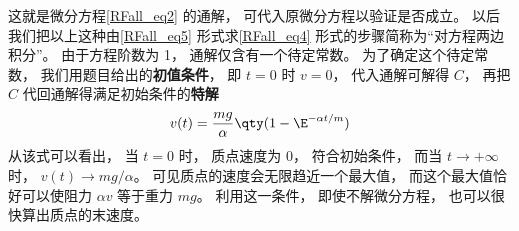 这就是微分方程\autoref{RFall_eq2} 的通解， 可代入原微分方程以验证是否成立。 以后我们把以上这种由\autoref{RFall_eq5} 形式求\autoref{RFall_eq4} 形式的步骤简称为“对方程两边积分”。 由于方程阶数为 1， 通解仅含有一个待定常数。 为了确定这个待定常数， 我们用题目给出的\textbf{初值条件}， 即 $t = 0$ 时 $v = 0$， 代入通解可解得 $C$， 再把 $C$ 代回通解得满足初始条件的\textbf{特解}
\begin{equation}
v(t) = \frac{mg}{\alpha} \qty( 1- \E^{-\alpha t/m} )
\end{equation}
从该式可以看出， 当 $t = 0$ 时， 质点速度为 0， 符合初始条件， 而当 $t\to +\infty$ 时， $ v(t) \to mg/\alpha$。 可见质点的速度会无限趋近一个最大值， 而这个最大值恰好可以使阻力 $\alpha v$ 等于重力 $mg$。 利用这一条件， 即使不解微分方程， 也可以很快算出质点的末速度。

